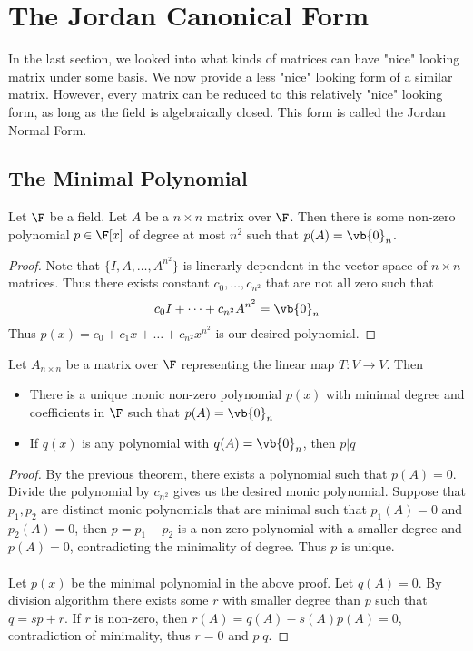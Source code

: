 \pagebreak
\section{The Jordan Canonical Form}
In the last section, we looked into what kinds of matrices can have "nice" looking matrix under some basis. We now provide a less "nice" looking form of a similar matrix. However, every matrix can be reduced to this relatively "nice" looking form, as long as the field is algebraically closed. This form is called the Jordan Normal Form. 
\subsection{The Minimal Polynomial}
\begin{thm}{}{} Let $\F$ be a field. Let $A$ be a $n\times n$ matrix over $\F$. Then there is some non-zero polynomial $p\in\F[x]$ of degree at most $n^2$ such that $p(A)=\vb{0}_n$. \tcbline\begin{proof} Note that $\{I,A,\dots,A^{n^2}\}$ is linerarly dependent in the vector space of $n\times n$ matrices. Thus there exists constant $c_0,\dots,c_{n^2}$ that are not all zero such that $$c_0I+\dots+c_{n^2}A^{n^2}=\vb{0}_n$$ Thus $p(x)=c_0+c_1x+\dots+c_{n^2}x^{n^2}$ is our desired polynomial. 
\end{proof}
\end{thm}

\begin{thm}{}{} Let $A_{n\times n}$ be a matrix over $\F$ representing the linear map $T:V\to V$. Then 
\begin{itemize}
\item There is a unique monic non-zero polynomial $p(x)$ with minimal degree and coefficients in $\F$ such that $p(A)=\vb{0}_n$
\item If $q(x)$ is any polynomial with $q(A)=\vb{0}_n$, then $p|q$
\end{itemize}\tcbline\begin{proof} By the previous theorem, there exists a polynomial such that $p(A)=0$. Divide the polynomial by $c_{n^2}$ gives us the desired monic polynomial. Suppose that $p_1,p_2$ are distinct monic polynomials that are minimal such that $p_1(A)=0$ and $p_2(A)=0$, then $p=p_1-p_2$ is a non zero polynomial with a smaller degree and $p(A)=0$, contradicting the minimality of degree. Thus $p$ is unique. \\~\\
Let $p(x)$ be the minimal polynomial in the above proof. Let $q(A)=0$. By division algorithm there exists some $r$ with smaller degree than $p$ such that $q=sp+r$. If $r$ is non-zero, then $r(A)=q(A)-s(A)p(A)=0$, contradiction of minimality, thus $r=0$ and $p|q$. 
\end{proof}
\end{thm}

